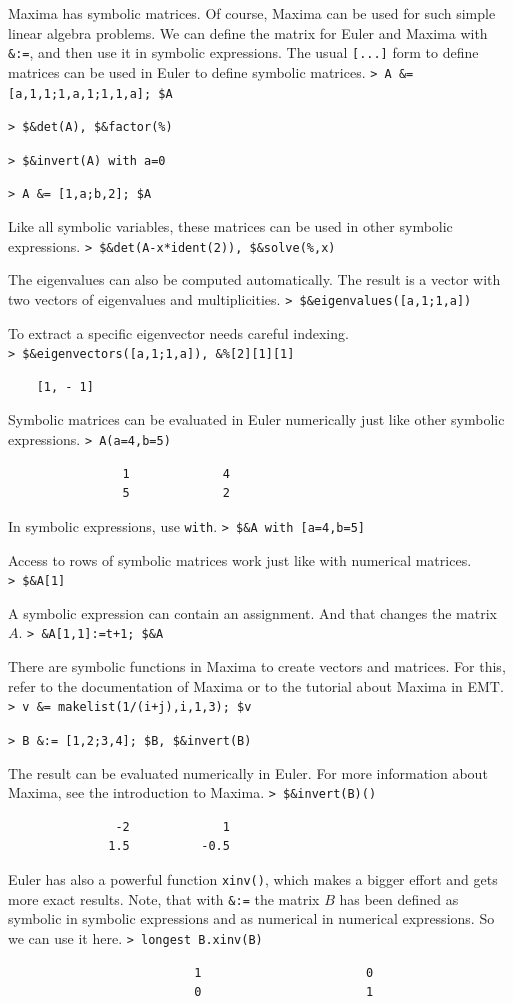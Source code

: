 \documentclass[11pt, a4paper]{article}
\newcommand{\emtcmd}[1]{\noindent\texttt{\textcolor{emtcommand}{>}\ #1}\par\smallskip}
\begin{document}
Maxima has symbolic matrices. Of course, Maxima can be used for such simple linear algebra problems. We can define the matrix for Euler and Maxima with \texttt{\&:=}, and then use it in symbolic expressions. The usual \texttt{[...]} form to define matrices can be used in Euler to define symbolic matrices.
\emtcmd{A \&= [a,1,1;1,a,1;1,1,a]; \$A}
\emtcmd{\$\&det(A), \$\&factor(\%)}
\emtcmd{\$\&invert(A) with a=0}
\emtcmd{A \&= [1,a;b,2]; \$A}

Like all symbolic variables, these matrices can be used in other symbolic expressions.
\emtcmd{\$\&det(A-x*ident(2)), \$\&solve(\%,x)}

The eigenvalues can also be computed automatically. The result is a vector with two vectors of eigenvalues and multiplicities.
\emtcmd{\$\&eigenvalues([a,1;1,a])}

To extract a specific eigenvector needs careful indexing.
\emtcmd{\$\&eigenvectors([a,1;1,a]), \&\%[2][1][1]}
\begin{verbatim}
    [1, - 1]
\end{verbatim}

Symbolic matrices can be evaluated in Euler numerically just like other symbolic expressions.
\emtcmd{A(a=4,b=5)}
\begin{verbatim}
                1             4
                5             2
\end{verbatim}

In symbolic expressions, use \texttt{with}.
\emtcmd{\$\&A with [a=4,b=5]}

Access to rows of symbolic matrices work just like with numerical matrices.
\emtcmd{\$\&A[1]}

A symbolic expression can contain an assignment. And that changes the matrix $A$.
\emtcmd{\&A[1,1]:=t+1; \$\&A}

There are symbolic functions in Maxima to create vectors and matrices. For this, refer to the documentation of Maxima or to the tutorial about Maxima in EMT.
\emtcmd{v \&= makelist(1/(i+j),i,1,3); \$v}
\emtcmd{B \&:= [1,2;3,4]; \$B, \$\&invert(B)}

The result can be evaluated numerically in Euler. For more information about Maxima, see the introduction to Maxima.
\emtcmd{\$\&invert(B)()}
\begin{verbatim}
               -2             1
              1.5          -0.5
\end{verbatim}

Euler has also a powerful function \texttt{xinv()}, which makes a bigger effort and gets more exact results. Note, that with \texttt{\&:=} the matrix $B$ has been defined as symbolic in symbolic expressions and as numerical in numerical expressions. So we can use it here.
\emtcmd{longest B.xinv(B)}
\begin{verbatim}
                          1                       0
                          0                       1
\end{verbatim}
\end{document}
